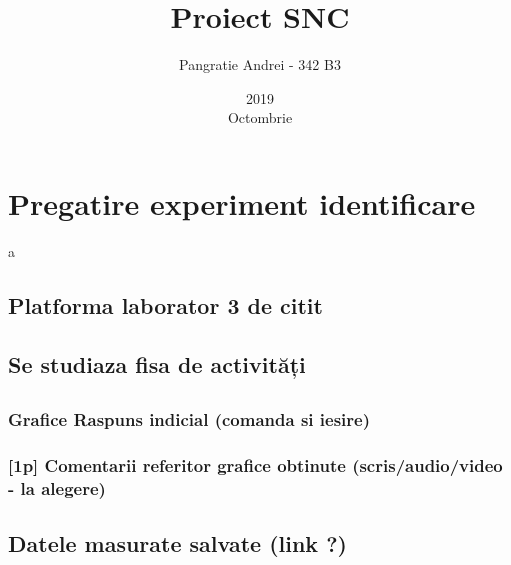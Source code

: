 \documentclass[12pt,english]{article}
\title{Proiect SNC}
\date{2019\\ Octombrie}
\author{Pangratie Andrei - 342 B3}
\begin{document}
\maketitle
\newpage

\tableofcontents
\newpage

\section { Pregatire experiment identificare }
a
\subsection { Platforma laborator 3 de citit }
\subsection { Se studiaza fisa de activități }
\subsection {  }
\subsubsection { Grafice Raspuns indicial (comanda si iesire) }
\begin{center}
\end{center}

\subsubsection { [1p] Comentarii referitor grafice obtinute (scris/audio/video - la alegere) }
\subsection { Datele masurate salvate (link ?) }
\end{document}
